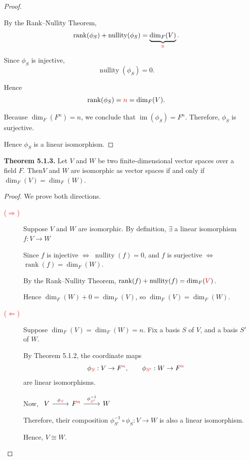 \documentclass[12pt]{article}
\begin{document}
\begin{proof}
\begin{enumerate}
    By the Rank--Nullity Theorem,
    \[
    \operatorname{rank}(\phi_S)+\operatorname{nullity}(\phi_S)=\underbrace{\dim_F(V)}_{\textcolor{red}{\text{n}}}.
    \]

    Since $\phi_S$ is injective,
    \[
    \operatorname{nullity}(\phi_S)=0.
    \]

    Hence
    \[
    \operatorname{rank}(\phi_S)=\textcolor{red}{n}=\dim_F(V).
    \]

    Because $\dim_F(F^n)=n$, we conclude that $\operatorname{im}(\phi_S)=F^n$.
    Therefore, $\phi_S$ is surjective.
\end{enumerate}

Hence $\phi_S$ is a linear isomorphism.
\end{proof}

\textbf{Theorem 5.1.3.}
Let $V$ and $W$ be two finite-dimensional vector spaces over a field $F$. Then$V$ and $W$ are isomorphic as vector spaces
if and only if $\dim_F(V)=\dim_F(W)$.

\begin{proof}
We prove both directions.

\begin{description}
    \item[\textcolor{red}{($\Rightarrow$)}]
    Suppose $V$ and $W$ are isomorphic. By definition, $\exists$ a linear isomorphism $f:V\to W$

    Since $f$ is injective $\Longleftrightarrow$ $\operatorname{nullity}(f)=0$, and $f$ is surjective $\Longleftrightarrow$ $\operatorname{rank}(f)=\dim_F(W)$.

    By the Rank--Nullity Theorem, $\operatorname{rank}(f)+\operatorname{nullity}(f)=\dim_F(\textcolor{red}{V})$.

    Hence $\dim_F(W)+0=\dim_F(V)$, so $\dim_F(V)=\dim_F(W)$.

    \item[\textcolor{red}{($\Leftarrow$)}]
    Suppose $\dim_F(V)=\dim_F(W)=n$. Fix a basis $S$ of $V$, and a basis $S'$ of $W$.
    
    By Theorem 5.1.2, the coordinate maps
    \[
    \phi_{\textcolor{red}{S}}:V\to F^{\textcolor{red}{n}},\qquad\phi_{\textcolor{red}{S'}}:W\to F^{\textcolor{red}{n}}
    \]
    are linear isomorphisms.

    Now, $\begin{tikzcd} V\arrow[r, "\phi_{\textcolor{red}{S}}"]&F^{\textcolor{red}{n}}\arrow[r, "\phi_{\textcolor{red}{S'}}^{-1}"]&W \end{tikzcd}$

    Therefore, their composition $\phi_{S'}^{-1}\circ\phi_S:V\to W$ is also a linear isomorphism. 
    
    Hence, $V\cong W$. 

\end{description}
\end{proof}
\end{document}
